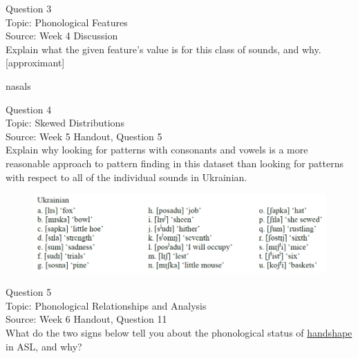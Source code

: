 \documentclass[12pt]{article}
\begin{document}
\newpage

{\large Question 3}\\

Topic: Phonological Features\\
Source: Week 4 Discussion\\

Explain what the given feature’s value is for this class of sounds, and why.\\

{[approximant]}

nasals


\newpage

{\large Question 4}\\

Topic: Skewed Distributions\\
Source: Week 5 Handout, Question 5\\

Explain why looking for patterns with consonants and vowels is a more reasonable approach to pattern finding in this dataset than looking for patterns with respect to all of the individual sounds in Ukrainian.\\

\begin{figure}[H]
\includegraphics{../images/ukrainian.png}
\end{figure}

\newpage

{\large Question 5}\\

Topic: Phonological Relationships and Analysis\\
Source: Week 6 Handout, Question 11\\

What do the two signs below tell you about the phonological status of \underline{handshape} in ASL, and why?\\
\end{document}

